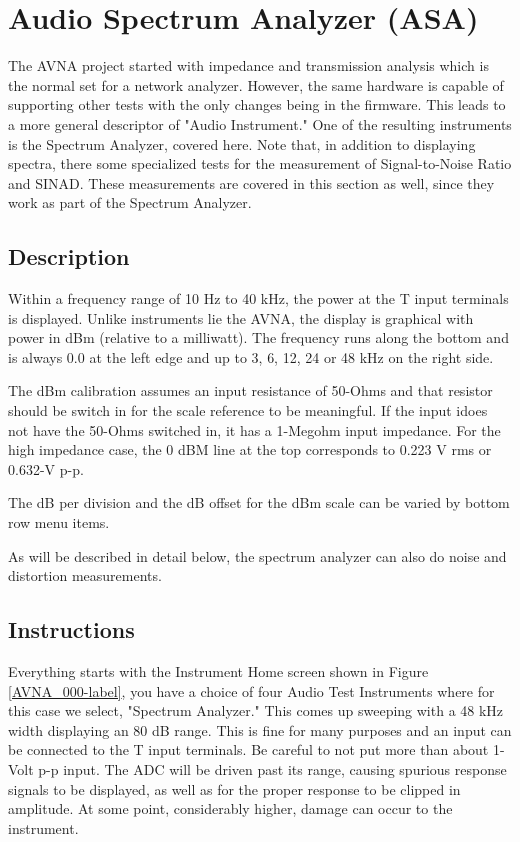\section{Audio Spectrum Analyzer (ASA)}
\label{sect:ASA}
The AVNA project started with impedance and transmission analysis which is the normal set for a network analyzer.  However, the same hardware is capable of supporting other tests with the only changes being in the firmware.  This leads to a more general descriptor of "Audio Instrument."  One of the resulting instruments is the Spectrum Analyzer, covered here.  Note that, in addition to displaying spectra,  there some specialized tests for the measurement of Signal-to-Noise Ratio and SINAD.  These measurements are covered in this section as well, since they work as part of the Spectrum Analyzer.
\subsection{Description}
\label{subsect:ASADescr}
Within a frequency range of 10 Hz to 40 kHz, the power at the T input terminals is displayed.  Unlike instruments lie the AVNA, the display is graphical with power in dBm (relative to a milliwatt).  The frequency runs along the bottom and is always 0.0 at the left edge and up to 3, 6, 12, 24 or 48 kHz on the right side. 

The dBm calibration assumes an input resistance of 50-Ohms and that resistor should be switch in for the scale reference to be meaningful.  If the input idoes not have the 50-Ohms switched in, it has a 1-Megohm input impedance.  For the high impedance case, the 0 dBM line at the top corresponds to 0.223 V rms or 0.632-V p-p.

The dB per division and the dB offset for the dBm scale can be varied by bottom row menu items.

As will be described in detail below, the spectrum analyzer can also do noise and  distortion measurements.

\subsection{Instructions}
\label{subsect:ASAInstr}
Everything starts with the Instrument Home screen shown in  Figure \ref{AVNA_000-label},  you have a choice of four Audio Test Instruments where for this case we select, "Spectrum Analyzer."  This comes up sweeping with a 48 kHz width displaying an 80 dB range.   This is fine for many purposes and an input can be connected to the T input terminals.  Be careful to not put more than about 1-Volt p-p input.  The ADC will be driven past its range, causing spurious response signals to be displayed, as well as for the proper response to be clipped in amplitude.  At some point, considerably higher, damage can occur to the instrument.

